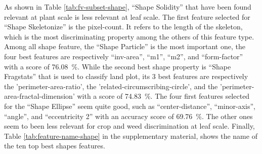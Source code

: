 \documentclass[../thesis.tex]{subfiles}
\begin{document}
    As shown in Table \ref{tab:fv-subset-shape}, ``Shape Solidity'' that have been found relevant at plant scale \cite{AHMED201298} is less relevant at leaf scale. The first feature selected for ``Shape Skeletonize'' is the pixel-count. It refers to the length of the skeleton, which is the most discriminating property among the others of this feature type. Among all shape feature, the ``Shape Particle'' is the most important one, the four best features are respectively ``inv-area'', ``m1'', ``m2'', and ``form-factor'' with a score of \SI{76.08}{\percent}. While the second best shape property is ``Shape Fragstats'' that is used to classify land plot, its 3 best features are respectively the 'perimeter-area-ratio', the 'related-circumscribing-circle', and the 'perimeter-area-fractal-dimension' with a score of \SI{74.83}{\percent}. The four first features selected for the ``Shape Ellipse'' seem quite good, such as ``center-distance'', ``minor-axis'', ``angle'', and ``eccentricity 2'' with an accuracy score of \SI{69.76}{\percent}. The other ones seem to been less relevant for crop and weed discrimination at leaf scale. Finally, Table \ref{tab:feature-name-shape} in the supplementary material, shows the name of the ten top best shapes features.
    
\end{document}
